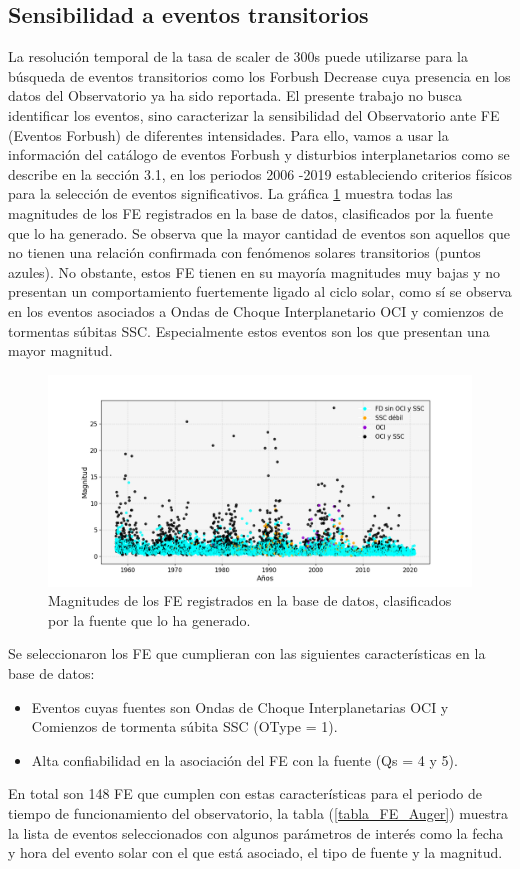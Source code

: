 \subsection{Sensibilidad a eventos transitorios}
La resolución temporal de la tasa de scaler de 300s puede utilizarse para la búsqueda de eventos transitorios como los Forbush Decrease cuya presencia en los datos del Observatorio ya ha sido reportada. El presente trabajo no busca identificar los eventos, sino caracterizar la sensibilidad del Observatorio ante FE (Eventos Forbush) de diferentes intensidades. Para ello, vamos a usar la información del catálogo de eventos Forbush y disturbios interplanetarios como se describe en la sección 3.1, en los periodos 2006 -2019 estableciendo criterios físicos para la selección de eventos significativos. La gráfica \ref{fig:FD_events} muestra todas las magnitudes de los FE registrados en la base de datos, clasificados por la fuente que lo ha generado. Se observa que la mayor cantidad de eventos son aquellos que no tienen una relación confirmada  con fenómenos solares transitorios (puntos azules). No obstante, estos FE tienen en su mayoría magnitudes muy bajas y no presentan un comportamiento fuertemente ligado al ciclo solar, como sí se observa en los eventos asociados a Ondas de Choque Interplanetario OCI y comienzos de tormentas súbitas SSC. Especialmente estos eventos son los que presentan una mayor magnitud.
\begin{figure}
\centering
\includegraphics[width=1.2\linewidth]{Figs/Figr/forbush_events.png}
    \caption{Magnitudes de los FE registrados en la base de datos, clasificados por la fuente que lo ha generado. }
    \label{fig:FD_events}
\end{figure}
Se seleccionaron los FE que cumplieran con las siguientes características en la base de datos:
\begin{itemize}
    \item Eventos cuyas fuentes son Ondas de Choque Interplanetarias OCI y Comienzos de tormenta súbita SSC (OType = 1).
    \item Alta confiabilidad en la asociación del FE con la fuente (Qs = 4 y 5).
\end{itemize}
En total son 148 FE que cumplen con estas características para el periodo de tiempo de funcionamiento del observatorio, la tabla (\ref{tabla_FE_Auger}) muestra la lista de eventos seleccionados con algunos parámetros de interés como la fecha y hora del evento solar con el que está asociado, el tipo de fuente y la magnitud.



